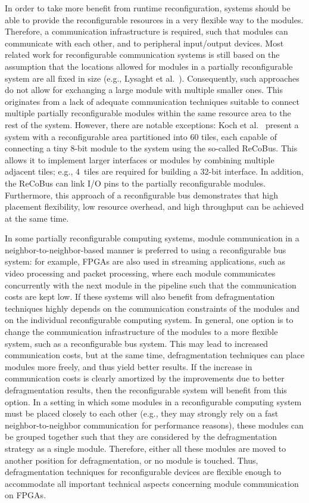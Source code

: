 \documentclass{article}
\begin{document}
In order to take more benefit from runtime reconfiguration, 
systems should be able to provide the reconfigurable resources in a very
flexible way to the modules. Therefore, a communication infrastructure is
required, such that modules can communicate with each other, and to peripheral
input/output devices.  Most related work for reconfigurable communication
systems is still based on the assumption that the locations allowed for modules
in a partially reconfigurable system are all fixed in size (e.g., Lysaght et
al.~\cite{xilinx_fpl06}). Consequently, such approaches do not allow for
exchanging a large module with multiple smaller ones. This originates from a
lack of adequate communication techniques suitable to connect multiple
partially reconfigurable modules within the same resource area to the rest of
the system.
However, there are notable exceptions: Koch et al.~\cite{koch_fpl08,koch_fccm} present a system with a reconfigurable area
partitioned into 60 tiles, each capable of connecting 
a tiny 8-bit module to the system using
the so-called ReCoBus.
This allows it to implement larger interfaces or modules by combining
multiple
adjacent tiles; e.g., 4~tiles are required for building a 32-bit
interface.
In addition, the ReCoBus can link I/O pins to the partially reconfigurable
modules. Furthermore, this approach of a reconfigurable bus demonstrates
that high placement flexibility, low resource overhead, and high throughput can
be achieved at the same time.

In some partially reconfigurable computing systems, module communication in a
neighbor-to-neighbor-based manner is preferred to using a
reconfigurable bus system:  for example, FPGAs are also used in streaming
applications, such as video processing and packet processing, where each module
communicates concurrently with the next module in the pipeline such that the
communication costs are kept low. If these systems will also benefit from
defragmentation techniques highly depends on the communication constraints of
the modules and on the individual reconfigurable computing system. In general,
one option is to change the communication infrastructure of the modules to a
more flexible system, such as a reconfigurable bus system. This may lead to
increased communication costs, but at the same time, defragmentation techniques
can place modules more freely, and thus yield better results. If the increase
in communication costs is clearly amortized by the improvements due to better
defragmentation results, then the reconfigurable system will benefit from this
option. In a setting in which some modules in a reconfigurable computing system
must be placed closely to each other (e.g., they may strongly rely on a fast
neighbor-to-neighbor communication for performance reasons),
these modules can be grouped together such that they are considered by the
defragmentation strategy as a single module. Therefore, either all these
modules are moved to another position for defragmentation, or no module is
touched. Thus, defragmentation techniques for reconfigurable devices are
flexible enough to accommodate all important technical aspects concerning
module communication on FPGAs. 
\end{document}
